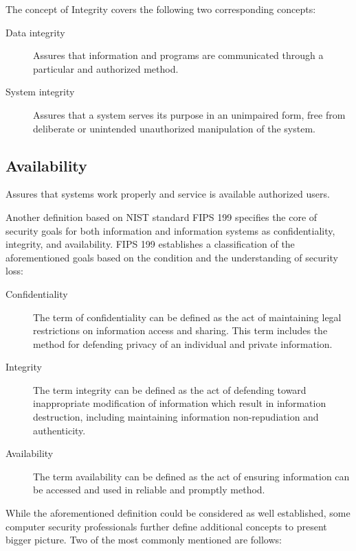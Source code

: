 \documentclass[../index.tex]{subfiles}
\begin{document}
The concept of Integrity covers the following two corresponding concepts:

\begin{description}
	\item[Data integrity] Assures that information and programs are communicated through a particular
		and authorized method.
	\item[System integrity] Assures that a system serves its purpose in an unimpaired form, free from
		deliberate or unintended unauthorized manipulation of the system.
\end{description}

\subsection{Availability}

Assures that systems work properly and service is available authorized users.

Another definition based on NIST standard FIPS 199 specifies the core of security goals for both
information and information systems as confidentiality, integrity, and availability. FIPS 199
establishes a classification of the aforementioned goals based on the condition and the
understanding of security loss:

\begin{description}
	\item[Confidentiality] The term of confidentiality can be defined as the act of maintaining legal
		restrictions on information access and sharing. This term includes the method for defending
		privacy of an individual and private information.
	\item[Integrity] The term integrity can be defined as the act of defending toward inappropriate
		modification of information which result in information destruction, including maintaining
		information non-repudiation and authenticity.
	\item[Availability] The term availability can be defined as the act of ensuring information can be
		accessed and used in reliable and promptly method.
\end{description}

While the aforementioned definition could be considered as well established, some computer security
professionals further define additional concepts to present bigger picture. Two of the most commonly
mentioned are follows:
\end{document}
